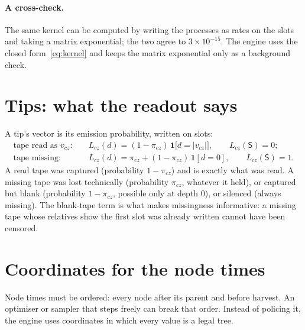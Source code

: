 \documentclass[11pt]{article}
\newcommand{\Sil}{\mathsf{S}}               %
\begin{document}
\paragraph{A cross-check.} The same kernel can be computed by writing the processes as rates on the
slots and taking a matrix exponential; the two agree to $3\times10^{-15}$. The engine uses the closed
form~\eqref{eq:kernel} and keeps the matrix exponential only as a background check.

\section{Tips: what the readout says}\label{sec:tips}

A tip's vector is its emission probability, written on slots:
\begin{align}
\text{tape read as }v_{cz}: &\quad L_{cz}(d)=(1-\pi_{cz})\,\mathbf 1\big[d=|v_{cz}|\big],\qquad L_{cz}(\Sil)=0;\\
\text{tape missing}: &\quad L_{cz}(d)=\pi_{cz}+(1-\pi_{cz})\,\mathbf 1[d=0],\qquad L_{cz}(\Sil)=1 .
\end{align}
A read tape was captured (probability $1-\pi_{cz}$) and is exactly what was read. A missing tape was
lost technically (probability $\pi_{cz}$, whatever it held), or captured but blank (probability
$1-\pi_{cz}$, possible only at depth 0), or silenced (always missing). The blank-tape term is what
makes missingness informative: a missing tape whose relatives show the first slot was already written
cannot have been censored.

\section{Coordinates for the node times}\label{sec:coords}

Node times must be ordered: every node after its parent and before harvest. An optimiser or sampler
that steps freely can break that order. Instead of policing it, the engine uses coordinates in which
every value is a legal tree.
\end{document}
